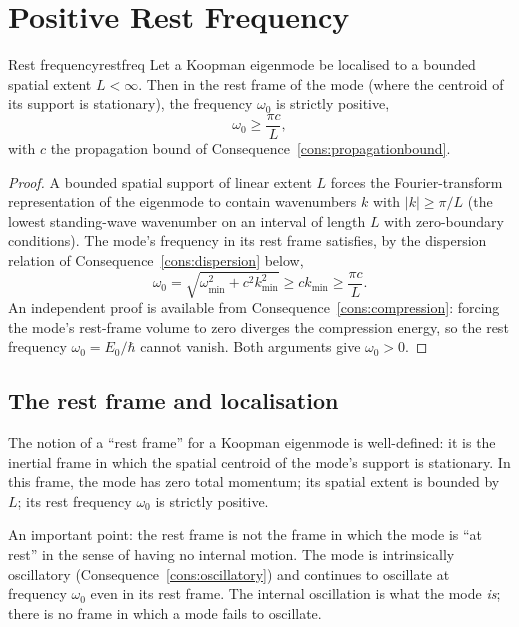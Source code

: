 \section{Positive Rest Frequency}
\label{sec:restfreq}

\begin{consequence}{Rest frequency}{restfreq}
Let a Koopman eigenmode be localised to a bounded spatial extent $L<\infty$. Then in the rest frame of the mode (where the centroid of its support is stationary), the frequency $\omega_{0}$ is strictly positive,
\begin{equation}
\omega_{0}\ge \frac{\pi c}{L},
\label{eq:restfreqbound}
\end{equation}
with $c$ the propagation bound of Consequence~\ref{cons:propagationbound}.
\end{consequence}

\begin{proof}
A bounded spatial support of linear extent $L$ forces the Fourier-transform representation of the eigenmode to contain wavenumbers $k$ with $|k|\ge\pi/L$ (the lowest standing-wave wavenumber on an interval of length $L$ with zero-boundary conditions). The mode's frequency in its rest frame satisfies, by the dispersion relation of Consequence~\ref{cons:dispersion} below,
\begin{equation*}
\omega_{0}=\sqrt{\omega_{\min}^{2}+c^{2}k_{\min}^{2}}\ge ck_{\min}\ge\frac{\pi c}{L}.
\end{equation*}
An independent proof is available from Consequence~\ref{cons:compression}: forcing the mode's rest-frame volume to zero diverges the compression energy, so the rest frequency $\omega_{0}=E_{0}/\hbar$ cannot vanish. Both arguments give $\omega_{0}>0$.
\end{proof}

\subsection{The rest frame and localisation}

The notion of a ``rest frame'' for a Koopman eigenmode is well-defined: it is the inertial frame in which the spatial centroid of the mode's support is stationary. In this frame, the mode has zero total momentum; its spatial extent is bounded by $L$; its rest frequency $\omega_{0}$ is strictly positive.

An important point: the rest frame is not the frame in which the mode is ``at rest'' in the sense of having no internal motion. The mode is intrinsically oscillatory (Consequence~\ref{cons:oscillatory}) and continues to oscillate at frequency $\omega_{0}$ even in its rest frame. The internal oscillation is what the mode \emph{is}; there is no frame in which a mode fails to oscillate.

